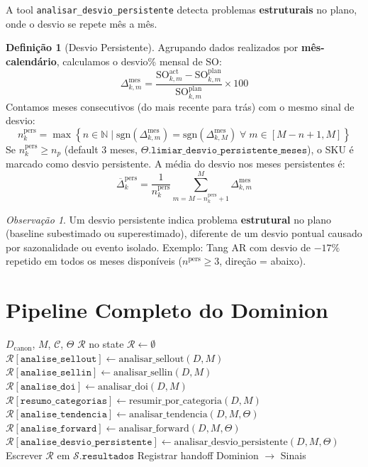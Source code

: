\documentclass[a4paper, 12pt]{report}
\theoremstyle{definition}
\newtheorem{definicao}{Defini\c{c}\~ao}[chapter]
\theoremstyle{remark}
\newtheorem{observacao}{Observa\c{c}\~ao}[chapter]
\newcommand{\N}{\mathbb{N}}
\newcommand{\set}[1]{\left\{#1\right\}}
\newcommand{\state}{\mathcal{S}}
\begin{document}
A tool \texttt{analisar\_desvio\_persistente} detecta problemas
\textbf{estruturais} no plano, onde o desvio se repete m\^es a m\^es.

\begin{definicao}[Desvio Persistente]
  Agrupando dados realizados por \textbf{m\^es-calend\'ario},
  calculamos o desvio\% mensal de SO:
  \[
    \Delta^{\text{mes}}_{k,m} = \frac{\text{SO}^{\text{act}}_{k,m} - \text{SO}^{\text{plan}}_{k,m}}
                                      {\text{SO}^{\text{plan}}_{k,m}} \times 100
  \]
  Contamos meses consecutivos (do mais recente para tr\'as) com o mesmo
  sinal de desvio:
  \[
    n^{\text{pers}}_k = \max\set{n \in \N \mid
      \text{sgn}(\Delta^{\text{mes}}_{k,m}) = \text{sgn}(\Delta^{\text{mes}}_{k,M})
      \;\forall\; m \in [M-n+1, M]}
  \]
  Se $n^{\text{pers}}_k \geq n_p$ (default 3 meses,
  $\Theta.\texttt{limiar\_desvio\_persistente\_meses}$), o SKU \'e marcado
  como desvio persistente. A m\'edia do desvio nos meses persistentes \'e:
  \[
    \overline{\Delta}^{\text{pers}}_k = \frac{1}{n^{\text{pers}}_k}
      \sum_{m=M-n^{\text{pers}}_k+1}^{M} \Delta^{\text{mes}}_{k,m}
  \]
\end{definicao}

\begin{observacao}
  Um desvio persistente indica problema \textbf{estrutural} no plano
  (baseline subestimado ou superestimado), diferente de um desvio
  pontual causado por sazonalidade ou evento isolado.
  Exemplo: Tang AR com desvio de $-17\%$ repetido em todos os meses
  dispon\'iveis ($n^{\text{pers}} \geq 3$, dire\c{c}\~ao = abaixo).
\end{observacao}


\section{Pipeline Completo do Dominion}

\begin{algorithm}[H]
\caption{Dominion -- An\'alises Determin\'isticas}
\begin{algorithmic}[1]
  \Require $D_{\text{canon}}$, $M$, $\mathcal{C}$, $\Theta$
  \Ensure $\mathcal{R}$ no state
  \State $\mathcal{R} \gets \emptyset$
    \State $\mathcal{R}[\texttt{analise\_sellout}] \gets \text{analisar\_sellout}(D, M)$
  \EndIf
    \State $\mathcal{R}[\texttt{analise\_sellin}] \gets \text{analisar\_sellin}(D, M)$
  \EndIf
    \State $\mathcal{R}[\texttt{analise\_doi}] \gets \text{analisar\_doi}(D, M)$
  \EndIf
  \State $\mathcal{R}[\texttt{resumo\_categorias}] \gets \text{resumir\_por\_categoria}(D, M)$
  \State $\mathcal{R}[\texttt{analise\_tendencia}] \gets \text{analisar\_tendencia}(D, M, \Theta)$
  \State $\mathcal{R}[\texttt{analise\_forward}] \gets \text{analisar\_forward}(D, M, \Theta)$
  \State $\mathcal{R}[\texttt{analise\_desvio\_persistente}] \gets
    \text{analisar\_desvio\_persistente}(D, M, \Theta)$
  \State Escrever $\mathcal{R}$ em $\state.\texttt{resultados}$
  \State Registrar handoff Dominion $\to$ Sinais
\end{algorithmic}
\end{algorithm}
\end{document}
